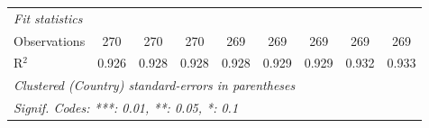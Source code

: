 \begin{table}[htbp]
\begin{tabular}{lcccccccc}
      \midrule \emph{Fit statistics}\\
      Observations                            & 270            & 270            & 270          & 269          & 269          & 269          & 269           & 269\\  
      R$^2$                                   & 0.926          & 0.928          & 0.928        & 0.928        & 0.929        & 0.929        & 0.932         & 0.933\\  
      \midrule
      \multicolumn{9}{l}{\emph{Clustered (Country) standard-errors in parentheses}}\\
      \multicolumn{9}{l}{\emph{Signif. Codes: ***: 0.01, **: 0.05, *: 0.1}}\\
   \end{tabular}
\end{table}


